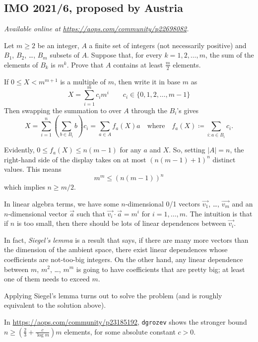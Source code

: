\documentclass[11pt]{scrartcl}
\begin{document}
\subsection{IMO 2021/6, proposed by Austria}
\textsl{Available online at \url{https://aops.com/community/p22698082}.}
\begin{mdframed}[style=mdpurplebox,frametitle={Problem statement}]
Let $m \ge 2$ be an integer,
$A$ a finite set of integers (not necessarily positive)
and $B_1$, $B_2$, \dots, $B_m$ subsets of $A$.
Suppose that, for every $k=1,2,\dots,m$,
the sum of the elements of $B_k$ is $m^k$.
Prove that $A$ contains at least $\frac{m}{2}$ elements.
\end{mdframed}
If $0 \le X < m^{m+1}$ is a multiple of $m$, then write it in base $m$ as
\[ X = \sum_{i=1}^m c_i m^i \qquad c_i \in \{0,1,2,\dots,m-1\} \]
Then swapping the summation to over $A$ through the $B_i$'s gives
\[ X = \sum_{i = 1}^n \left( \sum_{b \in B_i} b \right) c_i
  = \sum_{a \in A}  f_a(X) a
  \quad\text{where}\quad
  f_a(X) \coloneqq \sum_{i : a \in B_i} c_i.
\]

Evidently, $0 \le f_a(X) \le n(m-1)$ for any $a$ and $X$.
So, setting $|A| = n$, the right-hand side of the display takes on at most
$\left( n(m-1) + 1 \right)^n$ distinct values.
This means
\[ m^m \le \left( n(m-1) \right)^n \]
which implies $n \ge m/2$.

\begin{remark*}
  In linear algebra terms,
  we have some $n$-dimensional 0/1 vectors $\vec{v_1}$, \dots, $\vec{v_m}$
  and an $n$-dimensional vector $\vec a$
  such that $\vec{v_i} \cdot \vec a = m^i$ for $i=1, \dots, m$.
  The intuition is that if $n$ is too small,
  then there should be lots of linear dependences between $\vec{v_i}$.

  In fact, \emph{Siegel's lemma} is a result that says,
  if there are many more vectors than the dimension of the ambient space,
  there exist linear dependences whose coefficients are not-too-big integers.
  On the other hand, any linear dependence between $m$, $m^2$, \dots, $m^m$
  is going to have coefficients that are pretty big;
  at least one of them needs to exceed $m$.

  Applying Siegel's lemma turns out to solve the problem
  (and is roughly equivalent to the solution above).
\end{remark*}

\begin{remark*}
  In \url{https://aops.com/community/p23185192},
  \texttt{dgrozev} shows the stronger bound
  $n \ge \left(\frac{2}{3}+\frac{c}{\log m} \right)m$ elements,
  for some absolute constant $c > 0$.
\end{remark*}
\pagebreak
\end{document}
